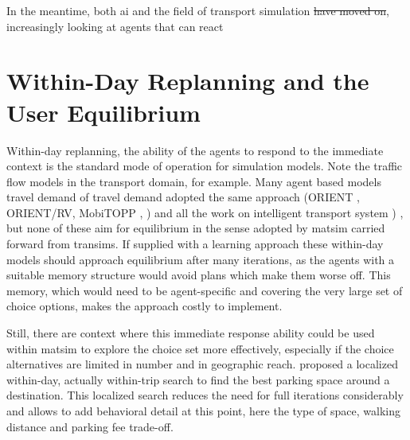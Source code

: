 In the meantime, both \gls{ai} and the field of transport simulation \st{have moved on},   increasingly looking at agents that can react 



\section{Within-Day Replanning and the User Equilibrium}
\label{sec:researchavenues-withinday}
Within-day replanning, \ie the ability of the agents to respond to the immediate context is the standard mode of operation for simulation models. 
Note the traffic flow models in the transport domain, for example. 
Many agent based models travel demand of travel demand adopted the same approach (ORIENT \citep[][]{Sparmann_TechRep_1980}, ORIENT/RV, MobiTOPP \citep[][]{SchnittgerZumkeller_ETC_2004}, \citep[][]{EmmerinkEtAl_TransResC_1995}) and all the work on intelligent transport system 
)
, but none of these aim for equilibrium in the sense adopted by \gls{matsim} carried forward from \gls{transims}. 
If supplied with a learning approach these within-day models should approach equilibrium after many iterations, as the agents with a suitable memory structure would avoid plans which make them worse off. This memory, which would need to be agent-specific and covering the very large set of choice options, makes the approach costly to implement. 

Still, there are context where this immediate response ability could be used within \gls{matsim} to explore the choice set more effectively, especially if the choice alternatives are limited in number and in geographic reach. 
\citet[][]{WaraichEtAl_TechRep_IVT_2013_2}
proposed a localized within-day, actually within-trip search to find the best parking space around a destination. 
This localized search reduces the need for full iterations considerably and allows to add behavioral detail at this point, here the type of space, walking distance and parking fee trade-off. 

